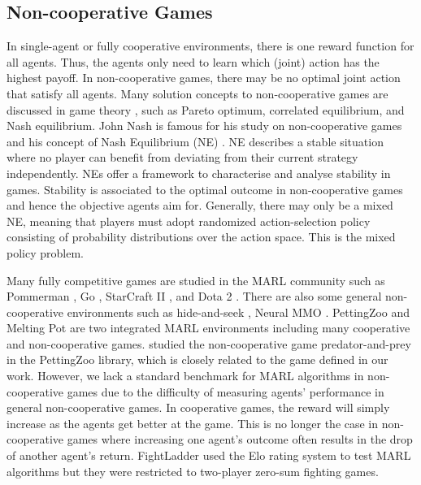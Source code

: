 \documentclass[]{interact}
\theoremstyle{plain}%
\theoremstyle{definition}
\theoremstyle{remark}
\begin{document}
\subsection{Non-cooperative Games}
In single-agent or fully cooperative environments, there is one reward function for all agents. Thus, the agents only need to learn which (joint) action has the highest payoff. In non-cooperative games, there may be no optimal joint action that satisfy all agents. Many solution concepts to non-cooperative games are discussed in game theory \cite{albrecht2024multi}, such as Pareto optimum, correlated equilibrium, and Nash equilibrium. John Nash is famous for his study on non-cooperative games and his concept of Nash Equilibrium (NE) \cite{nash2024non}. NE describes a stable situation where no player can benefit from deviating from their current strategy independently. NEs offer a framework to characterise and analyse stability in games. Stability is associated to the optimal outcome in non-cooperative games and hence the objective agents aim for. Generally, there may only be a mixed NE, meaning that players must adopt randomized action-selection policy consisting of probability distributions over the action space. This is the mixed policy problem.

Many fully competitive games are studied in the MARL community such as Pommerman \cite{resnick2018pommerman}, Go \cite{silver2017mastering}, StarCraft II \cite{vinyals2019grandmaster}, and Dota 2 \cite{berner2019dota}. There are also some general non-cooperative environments such as hide-and-seek \cite{baker2019emergent}, Neural MMO \cite{suarez2021neural}. PettingZoo and Melting Pot \cite{terry2021pettingzoo, leibo2021scalable} are two integrated MARL environments including many cooperative and non-cooperative games. \cite{kopacz2023evaluating} studied the non-cooperative game predator-and-prey in the PettingZoo library, which is closely related to the game defined in our work. However, we lack a standard benchmark for MARL algorithms in non-cooperative games due to the difficulty of measuring agents' performance in general non-cooperative games. In cooperative games, the reward will simply increase as the agents get better at the game. This is no longer the case in non-cooperative games where increasing one agent's outcome often results in the drop of another agent's return. FightLadder \cite{li2024fightladder} used the Elo rating system to test MARL algorithms but they were restricted to two-player zero-sum fighting games.
\end{document}
